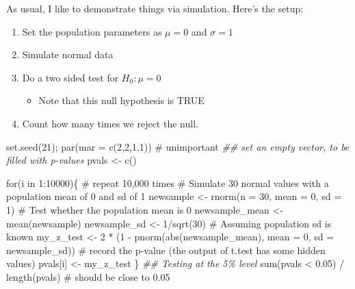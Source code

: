 \documentclass[
  letterpaper,
  DIV=11,
  numbers=noendperiod]{scrreprt}
\newenvironment{Shaded}{\begin{snugshade}}{\end{snugshade}}
\newcommand{\AttributeTok}[1]{\textcolor[rgb]{0.40,0.45,0.13}{#1}}
\newcommand{\CommentTok}[1]{\textcolor[rgb]{0.37,0.37,0.37}{#1}}
\newcommand{\ControlFlowTok}[1]{\textcolor[rgb]{0.00,0.23,0.31}{#1}}
\newcommand{\DecValTok}[1]{\textcolor[rgb]{0.68,0.00,0.00}{#1}}
\newcommand{\DocumentationTok}[1]{\textcolor[rgb]{0.37,0.37,0.37}{\textit{#1}}}
\newcommand{\FloatTok}[1]{\textcolor[rgb]{0.68,0.00,0.00}{#1}}
\newcommand{\FunctionTok}[1]{\textcolor[rgb]{0.28,0.35,0.67}{#1}}
\newcommand{\NormalTok}[1]{\textcolor[rgb]{0.00,0.23,0.31}{#1}}
\newcommand{\OtherTok}[1]{\textcolor[rgb]{0.00,0.23,0.31}{#1}}
\newcommand{\SpecialCharTok}[1]{\textcolor[rgb]{0.37,0.37,0.37}{#1}}
\providecommand{\tightlist}{%
  \setlength{\itemsep}{0pt}\setlength{\parskip}{0pt}}\usepackage{longtable,booktabs,array}
\begin{document}
As usual, I like to demonstrate things via simulation. Here's the setup:

\begin{enumerate}
\def\labelenumi{\arabic{enumi}.}
\tightlist
\item
  Set the population parameters as \(\mu = 0\) and
  \(\sigma = 1\)\newline
\item
  Simulate normal data\newline
\item
  Do a two sided test for \(H_0: \mu = 0\)

  \begin{itemize}
  \tightlist
  \item
    Note that this null hypothesis is TRUE\newline
  \end{itemize}
\item
  Count how many times we reject the null.
\end{enumerate}

\begin{Shaded}
\begin{Highlighting}[]
\FunctionTok{set.seed}\NormalTok{(}\DecValTok{21}\NormalTok{); }\FunctionTok{par}\NormalTok{(}\AttributeTok{mar =} \FunctionTok{c}\NormalTok{(}\DecValTok{2}\NormalTok{,}\DecValTok{2}\NormalTok{,}\DecValTok{1}\NormalTok{,}\DecValTok{1}\NormalTok{)) }\CommentTok{\# unimportant}
\DocumentationTok{\#\# set an empty vector, to be filled with p{-}values}
\NormalTok{pvals }\OtherTok{\textless{}{-}} \FunctionTok{c}\NormalTok{() }

\ControlFlowTok{for}\NormalTok{(i }\ControlFlowTok{in} \DecValTok{1}\SpecialCharTok{:}\DecValTok{10000}\NormalTok{)\{ }\CommentTok{\# repeat 10,000 times}
    \CommentTok{\# Simulate 30 normal values with a population mean of 0 and sd of 1}
\NormalTok{    newsample }\OtherTok{\textless{}{-}} \FunctionTok{rnorm}\NormalTok{(}\AttributeTok{n =} \DecValTok{30}\NormalTok{, }\AttributeTok{mean =} \DecValTok{0}\NormalTok{, }\AttributeTok{sd =} \DecValTok{1}\NormalTok{)}
    \CommentTok{\# Test whether the population mean is 0}
\NormalTok{    newsample\_mean }\OtherTok{\textless{}{-}} \FunctionTok{mean}\NormalTok{(newsample)}
\NormalTok{    newsample\_sd }\OtherTok{\textless{}{-}} \DecValTok{1}\SpecialCharTok{/}\FunctionTok{sqrt}\NormalTok{(}\DecValTok{30}\NormalTok{) }\CommentTok{\# Assuming population sd is known}
\NormalTok{    my\_z\_test }\OtherTok{\textless{}{-}} \DecValTok{2} \SpecialCharTok{*}\NormalTok{ (}\DecValTok{1} \SpecialCharTok{{-}} \FunctionTok{pnorm}\NormalTok{(}\FunctionTok{abs}\NormalTok{(newsample\_mean), }\AttributeTok{mean =} \DecValTok{0}\NormalTok{, }\AttributeTok{sd =}\NormalTok{ newsample\_sd))}
    \CommentTok{\# record the p{-}value (the output of t.test has some hidden values)}
\NormalTok{    pvals[i] }\OtherTok{\textless{}{-}}\NormalTok{ my\_z\_test}
\NormalTok{\}}
\DocumentationTok{\#\# Testing at the 5\% level}
\FunctionTok{sum}\NormalTok{(pvals }\SpecialCharTok{\textless{}} \FloatTok{0.05}\NormalTok{) }\SpecialCharTok{/} \FunctionTok{length}\NormalTok{(pvals) }\CommentTok{\# should be close to 0.05}
\end{Highlighting}
\end{Shaded}
\end{document}
